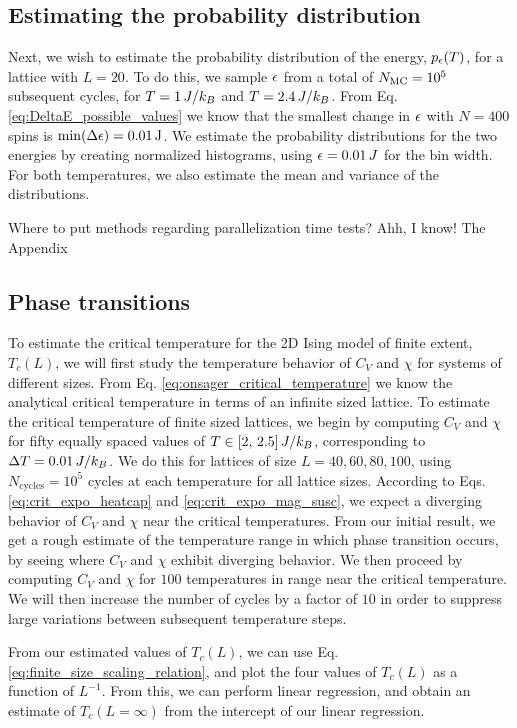

\subsection{Estimating the probability distribution}\label{subsec_methods:histogram}
Next, we wish to estimate the probability distribution of the energy, $p_\epsilon(T)$, for a lattice with $L=20$. To do this, we sample $\epsilon$ from a total of $N_\mathrm{MC}=10^5$ subsequent cycles, for $T=1\,J/k_B$ and $T=2.4\,J/k_B$. From Eq. \eqref{eq:DeltaE_possible_values} we know that the smallest change in $\epsilon$ with $N=400$ spins is $\min(\Delta\epsilon)=0.01\,\mathrm{J}$. We estimate the probability distributions for the two energies by creating normalized histograms, using $\epsilon=0.01\,J$ for the bin width. For both temperatures, we also estimate the mean and variance of the distributions.  

\alert{Where to put methods regarding parallelization time tests? Ahh, I know! The Appendix}

\subsection{Phase transitions}\label{subsec_methods:PT}
To estimate the critical temperature for the 2D Ising model of finite extent, $T_c(L)$, we will first study the temperature behavior of $C_V$ and $\chi$ for systems of different sizes. From Eq. \eqref{eq:onsager_critical_temperature} we know the analytical critical temperature in terms of an infinite sized lattice. To estimate the critical temperature of finite sized lattices, we begin by computing $C_V$ and $\chi$ for fifty equally spaced values of $T\in[2,\,2.5]\,J/k_B$, corresponding to $\Delta T = 0.01\,J/k_B$. We do this for lattices of size $L=40,60,80,100$, using $N_\mathrm{cycles}=10^5$ cycles at each temperature for all lattice sizes. According to Eqs. \eqref{eq:crit_expo_heatcap} and \eqref{eq:crit_expo_mag_susc}, we expect a diverging behavior of $C_V$ and $\chi$ near the critical temperatures. From our initial result, we get a rough estimate of the temperature range in which phase transition occurs, by seeing where $C_V$ and $\chi$ exhibit diverging behavior. We then proceed by computing $C_V$ and $\chi$ for $100$ temperatures in range near the critical temperature. We will then increase the number of cycles by a factor of $10$ in order to suppress large variations between subsequent temperature steps. 


From our estimated values of $T_c(L)$, we can use Eq. \eqref{eq:finite_size_scaling_relation}, and plot the four values of $T_c(L)$ as a function of $L^{-1}$. From this, we can perform linear regression, and obtain an estimate of $T_c(L=\infty)$ from the intercept of our linear regression. 

